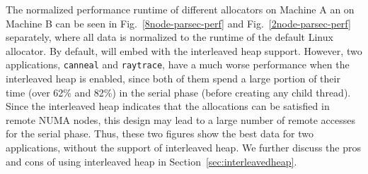 
The normalized performance runtime of different allocators on Machine A an on Machine B can be seen in Fig.~\ref{8node-parsec-perf} and Fig.~\ref{2node-parsec-perf} separately,  where all data is normalized to the runtime of the default Linux allocator. By default, \NM{} will embed with the interleaved heap support. However, two applications, \texttt{canneal} and \texttt{raytrace}, have  a much worse performance when the interleaved heap is enabled, since both of them spend a large portion of their time (over 62\% and 82\%) in the serial phase (before creating any child thread). Since the interleaved heap indicates that the allocations can be satisfied in remote NUMA nodes, this design may lead to a large number of remote accesses for the serial phase. Thus, these two figures show the best data for two applications, without the support of interleaved heap. We further discuss the pros and cons of using interleaved heap in Section~\ref{sec:interleavedheap}.  


